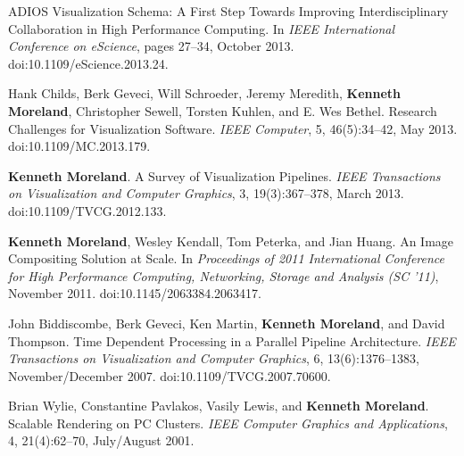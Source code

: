 \begin{enumerate}[label={[\arabic*]}, left=0pt]
  {ADIOS} Visualization Schema: A First Step Towards Improving Interdisciplinary Collaboration in High Performance Computing.
  In \emph{IEEE International Conference on eScience}, pages 27--34, October 2013.
  doi:10.1109/eScience.2013.24.
\item  %
  Hank Childs, Berk Geveci, Will Schroeder, Jeremy Meredith, \textbf{Kenneth Moreland}, Christopher Sewell, Torsten Kuhlen, and E. Wes Bethel.
  Research Challenges for Visualization Software.
  \emph{IEEE Computer}, 5, 46(5):34--42, May 2013.
  doi:10.1109/MC.2013.179.
\item  %
  \textbf{Kenneth Moreland}.
  A Survey of Visualization Pipelines.
  \emph{IEEE Transactions on Visualization and Computer Graphics}, 3, 19(3):367--378, March 2013.
  doi:10.1109/TVCG.2012.133.
\item  %
  \textbf{Kenneth Moreland}, Wesley Kendall, Tom Peterka, and Jian Huang.
  An Image Compositing Solution at Scale.
  In \emph{Proceedings of 2011 International Conference for High Performance Computing, Networking, Storage and Analysis (SC '11)}, November 2011.
  doi:10.1145/2063384.2063417.
\item  %
  John Biddiscombe, Berk Geveci, Ken Martin, \textbf{Kenneth Moreland}, and David Thompson.
  Time Dependent Processing in a Parallel Pipeline Architecture.
  \emph{IEEE Transactions on Visualization and Computer Graphics}, 6, 13(6):1376--1383, November/December 2007.
  doi:10.1109/TVCG.2007.70600.
\item  %
  Brian Wylie, Constantine Pavlakos, Vasily Lewis, and \textbf{Kenneth Moreland}.
  Scalable Rendering on {PC} Clusters.
  \emph{IEEE Computer Graphics and Applications}, 4, 21(4):62--70, July/August 2001.
\end{enumerate}
